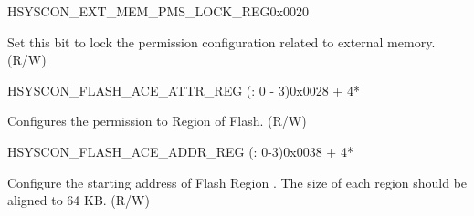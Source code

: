 















\begin{register}{H}{SYSCON\_EXT\_MEM\_PMS\_LOCK\_REG}{0x0020}\label{regdesc:SYSCONEXTMEMPMSLOCKREG}
%
%
\regnewline%
\begin{regdesc}\begin{reglist}
\label{fielddesc:SYSCONEXTMEMPMSLOCK}\item [SYSCON\_EXT\_MEM\_PMS\_LOCK] Set this bit to lock the permission configuration related to external memory. (R/W)
\end{reglist}\end{regdesc}
\end{register}




\begin{register}{H}{SYSCON\_FLASH\_ACE\_ATTR\_REG (: 0 - 3)}{0x0028 + 4*}\label{regdesc:SYSCONFLASHACEnATTRREG}
%
%
\regnewline%
\begin{regdesc}\begin{reglist}
\label{fielddesc:SYSCONFLASHACEnATTR}\item [SYSCON\_FLASH\_ACE\regindex{n}\_ATTR] Configures the permission to Region  of Flash. (R/W)
\end{reglist}\end{regdesc}
\end{register}

\begin{register}{H}{SYSCON\_FLASH\_ACE\_ADDR\_REG (: 0-3)}{0x0038 + 4*}\label{regdesc:SYSCONFLASHACEnADDRREG}
%
\regnewline%
\begin{regdesc}\begin{reglist}
\label{fielddesc:SYSCONFLASHACEnADDRS}\item [SYSCON\_FLASH\_ACE0\_ADDR\_S] Configure the starting address of Flash Region . The size of each region should be aligned to 64 KB. (R/W)
\end{reglist}\end{regdesc}
\end{register}


